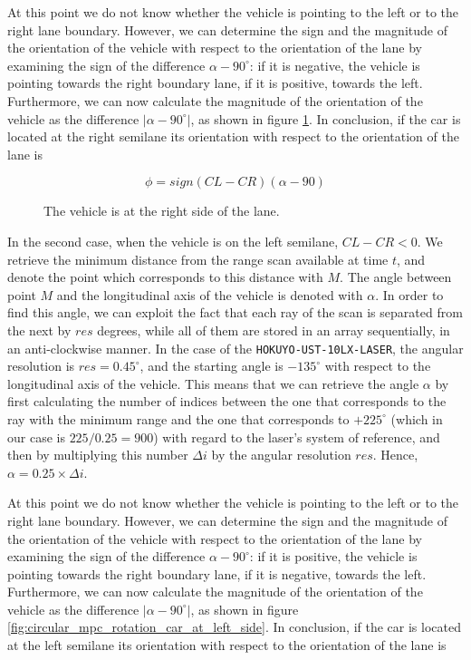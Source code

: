 At this point we do not know whether the vehicle is pointing to the
left or to the right lane boundary. However, we can determine the sign and the
magnitude of the orientation of the vehicle with respect to the orientation of
the lane by examining the sign of the difference $\alpha - 90^{\circ}$:
if it is negative, the vehicle is pointing towards the right boundary lane,
if it is positive, towards the left. Furthermore, we can now
calculate the magnitude of the orientation of the vehicle as the difference
$|\alpha - 90^{\circ}|$, as shown in figure \ref{fig:circular_mpc_rotation_car_at_right_side}.
In conclusion, if the car is located at the right semilane its orientation with
respect to the orientation of the lane is

$$\phi = sign(CL-CR)(\alpha - 90)$$


\begin{figure}[H]\centering
  \scalebox{1}{}
  \caption{The vehicle is at the right side of the lane.}
  \label{fig:circular_mpc_rotation_car_at_right_side}
\end{figure}

In the second case, when the vehicle is on the left semilane, $CL-CR < 0$.
We retrieve the minimum distance from the range scan available at time $t$,
and denote the point which corresponds to this distance with $M$. The angle
between point $M$ and the longitudinal axis of the vehicle is denoted with
$\alpha$. In order to find this angle, we can exploit the fact that each ray
of the scan is separated from the next by $res$ degrees, while all of them
are stored in an array sequentially, in an anti-clockwise manner. In the case
of the \texttt{HOKUYO-UST-10LX-LASER}, the angular resolution is
$res=0.45^{\circ}$, and the starting angle is $-135^{\circ}$ with respect to the
longitudinal axis of the vehicle. This means that we can retrieve the angle
$\alpha$ by first calculating the number of indices between the one that
corresponds to the ray with the minimum range and the one that corresponds
to $+225^{\circ}$ (which in our case is $225 / 0.25 = 900$) with regard to
the laser's system of reference, and then by multiplying this number
$\Delta i$ by the angular resolution $res$. Hence,
$\alpha = 0.25 \times \Delta i$.

At this point we do not know whether the vehicle is pointing to the
left or to the right lane boundary. However, we can determine the sign and the
magnitude of the orientation of the vehicle with respect to the orientation of
the lane by examining the sign of the difference $\alpha - 90^{\circ}$:
if it is positive, the vehicle is pointing towards the right boundary lane,
if it is negative, towards the left. Furthermore, we can now
calculate the magnitude of the orientation of the vehicle as the difference
$|\alpha - 90^{\circ}|$, as shown in figure \ref{fig:circular_mpc_rotation_car_at_left_side}.
In conclusion, if the car is located at the left semilane its orientation with
respect to the orientation of the lane is

